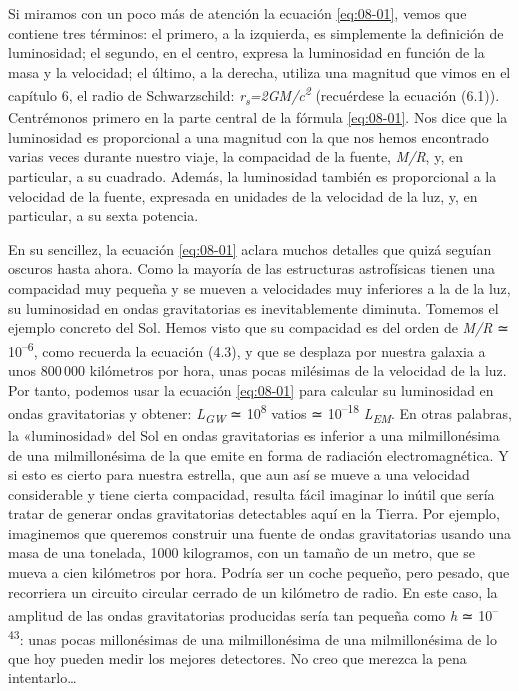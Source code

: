 Si miramos con un poco más de atención la ecuación \eqref{eq:08-01}, vemos que contiene tres términos: el primero, a la izquierda, es simplemente la definición de luminosidad; el segundo, en el centro, expresa la luminosidad en función de la masa y la velocidad; el último, a la derecha, utiliza una magnitud que vimos en el capítulo 6, el radio de Schwarzschild: \emph{r\textsubscript{s}=2GM/c\textsuperscript{2 }}(recuérdese la ecuación (6.1)). Centrémonos primero en la parte central de la fórmula \eqref{eq:08-01}. Nos dice que la luminosidad es proporcional a una magnitud con la que nos hemos encontrado varias veces durante nuestro viaje, la compacidad de la fuente, \emph{M/R}, y, en particular, a su cuadrado. Además, la luminosidad también es proporcional a la velocidad de la fuente, expresada en unidades de la velocidad de la luz, y, en particular, a su sexta potencia.

En su sencillez, la ecuación \eqref{eq:08-01} aclara muchos detalles que quizá seguían oscuros hasta ahora. Como la mayoría de las estructuras astrofísicas tienen una compacidad muy pequeña y se mueven a velocidades muy inferiores a la de la luz, su luminosidad en ondas gravitatorias es inevitablemente diminuta. Tomemos el ejemplo concreto del Sol. Hemos visto que su compacidad es del orden de \emph{M/R} ≃ 10\textsuperscript{--6}, como recuerda la ecuación (4.3), y que se desplaza por nuestra galaxia a unos 800\,000 kilómetros por hora, unas pocas milésimas de la velocidad de la luz. Por tanto, podemos usar la ecuación \eqref{eq:08-01} para calcular su luminosidad en ondas gravitatorias y obtener: \emph{L\textsubscript{GW}} ≃ 10\textsuperscript{8} vatios ≃ 10\textsuperscript{--18} \emph{L\textsubscript{EM}}. En otras palabras, la «luminosidad» del Sol en ondas gravitatorias es inferior a una milmillonésima de una milmillonésima de la que emite en forma de radiación electromagnética. Y si esto es cierto para nuestra estrella, que aun así se mueve a una velocidad considerable y tiene cierta compacidad, resulta fácil imaginar lo inútil que sería tratar de generar ondas gravitatorias detectables aquí en la Tierra. Por ejemplo, imaginemos que queremos construir una fuente de ondas gravitatorias usando una masa de una tonelada, 1000 kilogramos, con un tamaño de un metro, que se mueva a cien kilómetros por hora. Podría ser un coche pequeño, pero pesado, que recorriera un circuito circular cerrado de un kilómetro de radio. En este caso, la amplitud de las ondas gravitatorias producidas sería tan pequeña como \emph{h} ≃ 10\textsuperscript{--43}: unas pocas millonésimas de una milmillonésima de una milmillonésima de lo que hoy pueden medir los mejores detectores. No creo que merezca la pena intentarlo\ldots{}

